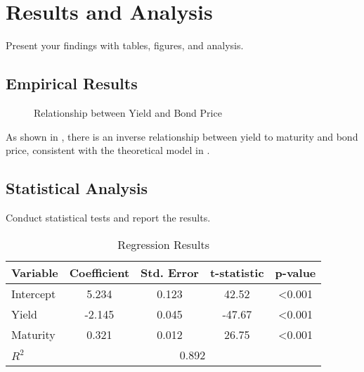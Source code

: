 \documentclass[12pt,a4paper]{article}
\theoremstyle{definition}
\begin{document}
\section{Results and Analysis}
\label{sec:results}

Present your findings with tables, figures, and analysis.

\subsection{Empirical Results}
\label{subsec:empirical}

\begin{figure}[H]
    \centering
    \caption{Relationship between Yield and Bond Price}
    \label{fig:yield_price}
\end{figure}

As shown in , there is an inverse relationship between
yield to maturity and bond price, consistent with the theoretical model in
.

\subsection{Statistical Analysis}
\label{subsec:stats}

Conduct statistical tests and report the results.

\begin{table}[H]
\centering
\caption{Regression Results}
\label{tab:regression}
\begin{tabular}{@{}lcccc@{}}
\toprule
Variable & Coefficient & Std. Error & t-statistic & p-value \\
\midrule
Intercept & 5.234 & 0.123 & 42.52 & <0.001 \\
Yield & -2.145 & 0.045 & -47.67 & <0.001 \\
Maturity & 0.321 & 0.012 & 26.75 & <0.001 \\
\midrule
$R^2$ & \multicolumn{4}{c}{0.892} \\
\bottomrule
\end{tabular}
\end{table}
\end{document}
